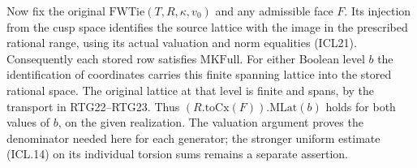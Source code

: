 Now fix the original $\mathrm{FWTie}(T,R,\kappa,v_0)$ and any
admissible face $F$. Its injection from the cusp space identifies
the source lattice with the image in the prescribed rational range,
using its actual valuation and norm equalities (ICL21).
Consequently each stored row satisfies $\mathrm{MKFull}$.
For either Boolean level $b$ the identification of coordinates
carries this finite spanning lattice into the stored rational space.
The original lattice at that level is finite and spans, by the
transport in RTG22--RTG23. Thus $(R.\mathrm{toCx}(F)).\mathrm{MLat}(b)$
holds for both values of $b$, on the given realization. The valuation
argument proves the denominator needed here for each generator;
the stronger uniform estimate (ICL.14) on its individual torsion
sums remains a separate assertion.
